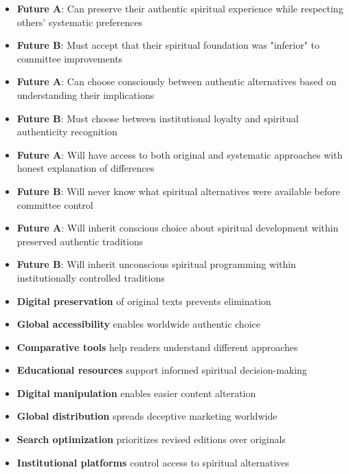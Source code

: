 \documentclass[12pt,twoside]{book}
\begin{document}
\begin{itemize}
\item \textbf{\textbf{Future A}}: Can preserve their authentic spiritual experience while respecting others' systematic preferences
\item \textbf{\textbf{Future B}}: Must accept that their spiritual foundation was "inferior" to committee improvements

\item \textbf{\textbf{Future A}}: Can choose consciously between authentic alternatives based on understanding their implications
\item \textbf{\textbf{Future B}}: Must choose between institutional loyalty and spiritual authenticity recognition

\item \textbf{\textbf{Future A}}: Will have access to both original and systematic approaches with honest explanation of differences
\item \textbf{\textbf{Future B}}: Will never know what spiritual alternatives were available before committee control

\item \textbf{\textbf{Future A}}: Will inherit conscious choice about spiritual development within preserved authentic traditions
\item \textbf{\textbf{Future B}}: Will inherit unconscious spiritual programming within institutionally controlled traditions
\end{itemize}


\begin{itemize}
\item \textbf{\textbf{Digital preservation}} of original texts prevents elimination
\item \textbf{\textbf{Global accessibility}} enables worldwide authentic choice
\item \textbf{\textbf{Comparative tools}} help readers understand different approaches
\item \textbf{\textbf{Educational resources}} support informed spiritual decision-making

\item \textbf{\textbf{Digital manipulation}} enables easier content alteration
\item \textbf{\textbf{Global distribution}} spreads deceptive marketing worldwide
\item \textbf{\textbf{Search optimization}} prioritizes revised editions over originals
\item \textbf{\textbf{Institutional platforms}} control access to spiritual alternatives
\end{itemize}
\end{document}
